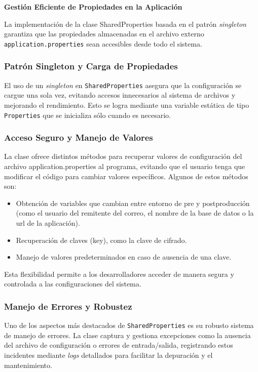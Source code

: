 \documentclass[draft]{scrbook}
\begin{document}
\textbf{Gestión Eficiente de Propiedades en la Aplicación}

La implementación de la clase SharedProperties basada en el patrón \textit{singleton} garantiza que las propiedades almacenadas en el archivo externo \texttt{application.properties} sean accesibles desde todo el sistema.

\subsubsection{Patrón Singleton y Carga de Propiedades}
El uso de un \textit{singleton} en \texttt{SharedProperties} asegura que la configuración se cargue una sola vez, evitando accesos innecesarios al sistema de archivos y mejorando el rendimiento. Esto se logra mediante una variable estática de tipo \texttt{Properties} que se inicializa sólo cuando es necesario.

\subsubsection{Acceso Seguro y Manejo de Valores}
La clase ofrece distintos métodos para recuperar valores de configuración del archivo application.properties al programa, evitando que el usuario tenga que modificar el código para cambiar valores específicos. Algunos de estos métodos son:
\begin{itemize}
    \item Obtención de variables que cambian entre entorno de pre y postproducción (como el usuario del remitente del correo, el nombre de la base de datos o la url de la aplicación).
    \item Recuperación de claves (key), como la clave de cifrado.
    \item Manejo de valores predeterminados en caso de ausencia de una clave.
\end{itemize}
Esta flexibilidad permite a los desarrolladores acceder de manera segura y controlada a las configuraciones del sistema.

\subsubsection{Manejo de Errores y Robustez}
Uno de los aspectos más destacados de \texttt{SharedProperties} es su robusto sistema de manejo de errores. La clase captura y gestiona excepciones como la ausencia del archivo de configuración o errores de entrada/salida, registrando estos incidentes mediante \textit{logs} detallados para facilitar la depuración y el mantenimiento.
\end{document}
